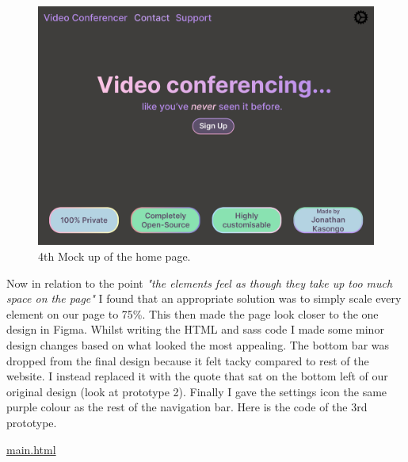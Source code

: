 \begin{figure}[H]
\centering

\includegraphics[scale=0.2]{Images/HomeUI_4.png}

\caption{4th Mock up of the home page.}
\end{figure}

Now in relation to the point \textit{"the elements feel as
though they take up too much space on the page"} I found that 
an appropriate solution was to simply scale every element on 
our page to 75\%. This then made the page look closer to the
one design in Figma. Whilst writing the HTML and sass code I
made some minor design changes based on what looked the most
appealing. The bottom bar was dropped from the final design
because it felt tacky compared to rest of the website. I 
instead replaced it with the quote that sat on the bottom 
left of our original design (look at prototype 2). Finally I 
gave the settings icon the same purple colour as the rest of
the navigation bar. Here is the code of the 3rd prototype. \\
\vspace{0.2cm}

\underline{main.html}

